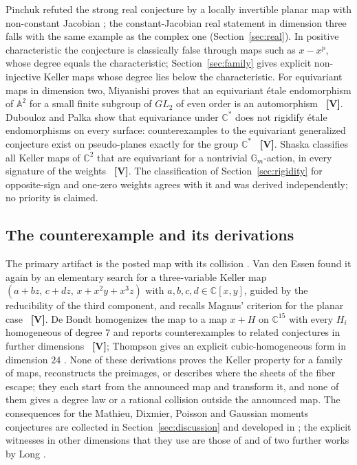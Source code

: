 \documentclass[11pt]{article}
\theoremstyle{definition}
\theoremstyle{remark}
\newcommand{\C}{\mathbb{C}}
\newcommand{\Gm}{\mathbb{G}_m}
\newcommand{\VV}{\textbf{[V]}}
\begin{document}
Pinchuk refuted the strong real conjecture by a locally invertible planar map with non-constant Jacobian \cite{Pinchuk1994}; the
constant-Jacobian real statement in dimension three falls with the same example as the complex one (Section~\ref{sec:real}). In positive
characteristic the conjecture is classically false through maps such as $x - x^p$, whose degree equals the characteristic; Section~\ref{sec:family}
gives explicit non-injective Keller maps whose degree lies below the characteristic. For equivariant maps in dimension two,
Miyanishi proves that an equivariant \'etale endomorphism of $\mathbb{A}^2$ for a small finite subgroup of $GL_2$ of even order is an
automorphism \cite{Miyanishi2023}~\VV{}. Dubouloz and Palka show that equivariance under $\C^*$ does not rigidify \'etale
endomorphisms on every surface: counterexamples to the equivariant generalized conjecture exist on pseudo-planes exactly for the group $\C^*$
\cite{DuboulozPalka2018}~\VV{}. Shaska classifies all Keller maps of $\C^2$ that are equivariant for a nontrivial $\Gm$-action, in every
signature of the weights \cite{Shaska2026}~\VV{}. The classification of Section~\ref{sec:rigidity} for opposite-sign and one-zero weights
agrees with it and was derived independently; no priority is claimed.

\subsection{The counterexample and its derivations}

The primary artifact is the posted map with its collision \cite{Alpoge2026}. Van den Essen found it again by an elementary search for a
three-variable Keller map $(a + bz,\, c + dz,\, x + x^2y + x^3z)$ with $a,b,c,d \in \C[x,y]$, guided by the reducibility of the third
component, and recalls Magnus' criterion for the planar case \cite{vdEssen2026}~\VV{}. De Bondt homogenizes the map to a map $x + H$ on
$\C^{15}$ with every $H_i$ homogeneous of degree $7$ and reports counterexamples to related conjectures in further dimensions
\cite{deBondt2026}~\VV{}; Thompson gives an explicit cubic-homogeneous form in dimension $24$ \cite{Thompson2026}. None of these derivations proves the Keller property for a family of maps, reconstructs the preimages, or describes where the sheets of the fiber escape; they each start from the announced map and
transform it, and none of them gives a degree law or a rational collision outside the announced map. The consequences for the Mathieu, Dixmier, Poisson and Gaussian moments conjectures are collected in Section~\ref{sec:discussion} and developed in \cite{SLcascade}; the explicit witnesses in other dimensions that
they use are those of \cite{deBondt2026} and of two further works by Long \cite{LongSU2, LongGMC}.
\end{document}
